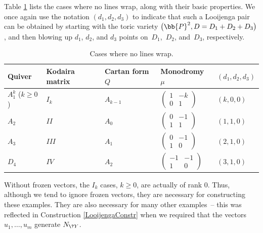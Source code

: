 Table \ref{tab:no wrap} lists the cases where no lines wrap, along with their basic properties. We once again use the notation $(d_1,d_2,d_3)$ to indicate that such a Looijenga pair can be obtained by starting with the toric variety $\big(\bb{P}^2,D=D_1+D_2+D_3\big)$, and then blowing up $d_1$, $d_2$, and $d_3$ points on~$D_1$,~$D_2$, and~$D_3$, respectively.
\begin{table}[h]\centering
 \begin{tabular}{ | l | l | l | l | l|}
 \hline
 Quiver & Kodaira matrix & Cartan form $Q$ & Monodromy $\mu$ & $(d_1,d_2,d_3)$ \\ \hline
 $A_1^k$ ($k\geq 0$) & $I_{k}$ & $A_{k-1}$ & 	 $\left(\begin{matrix}
		1 &-k \\
	 0 &1
		\end{matrix}\right)$				 		& $(k,0,0)$ \\ \hline
 $A_2$ & $II$ & $A_0$ & 		$\left(\begin{matrix}
		0 &-1 \\
	 1 &1
		\end{matrix}\right)$		& $(1,1,0)$	 \\ \hline
 $A_3$ & $III$ &$A_1$ &	$\left(\begin{matrix}
		0 &-1 \\
	 1 &0
		\end{matrix}\right)$	 	 & $(2,1,0)$	 \\ \hline
 $D_4$ & $IV$ &$A_2$ & 	$\left(\begin{matrix}
		-1 &-1 \\
	 1 &0
		\end{matrix}\right)$			& $(3,1,0)$			 \\ \hline
 \end{tabular}
 \caption{Cases where no lines wrap.}\label{tab:no wrap}
\end{table}

\begin{rmk}\label{NeedFrozen}
Without frozen vectors, the $I_k$ cases, $k\geq 0$, are actually of rank $0$. Thus, although we tend to ignore frozen vectors, they are necessary for constructing these examples. They are also necessary for many other examples~-- this was reflected in Construction \ref{LooijengaConstr} when we required that the vectors $u_1,\dots,u_m$ generate $N_{\?{Y}}$.
\end{rmk}

